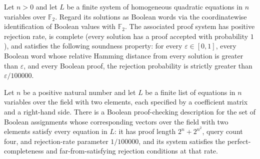 \begin{theorem}
\label{FABL.homogeneousQuadraticPCPPSystem_isPCPP}
\leanok
{}
Let $n>0$ and let $L$ be a finite system of homogeneous quadratic equations in $n$
variables over $\mathbb{F}_2$. Regard its solutions as Boolean words via the
coordinatewise identification of Boolean values with $\mathbb{F}_2$. The associated
proof system has positive rejection rate, is complete (every solution has a proof
accepted with probability $1$), and satisfies the following soundness property: for
every $\varepsilon\in[0,1]$, every Boolean word whose relative Hamming distance from
every solution is greater than $\varepsilon$, and every Boolean proof, the rejection
probability is strictly greater than $\varepsilon/100000$.
\end{theorem}

\begin{definition}
\label{FABL.homogeneousQuadraticPCPPDescription}
\leanok
{}
Let $n$ be a positive natural number and let $L$ be a finite list of equations in $n$
variables over the field with two elements, each specified by a coefficient matrix and a
right-hand side. There is a Boolean proof-checking description for the set of Boolean
assignments whose corresponding vectors over the field with two elements satisfy every
equation in $L$: it has proof length $2^n+2^{n^2}$, query count four, and rejection-rate
parameter $1/100000$, and its system satisfies the perfect-completeness and
far-from-satisfying rejection conditions at that rate.
\end{definition}

